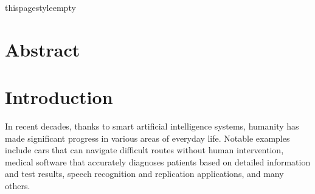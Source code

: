 \documentclass[14pt,a4paper]{extarticle}
\newcounter{e}
\newcounter{tabl}
\numberwithin{equation}{section}
\numberwithin{figure}{section}
\begin{document}
	

\thispagestyle{empty}
\newlength{\originalVOffset}
\newlength{\originalHOffset}
\setlength{\originalVOffset}{\voffset}   
\setlength{\originalHOffset}{\hoffset}
\setlength{\voffset}{0cm}
\setlength{\hoffset}{0cm}

\setlength{\voffset}{\originalVOffset}
\setlength{\hoffset}{\originalHOffset}






 \newpage
 \thispagestyle{empty}
 \renewcommand*\contentsname{Contents}
 \tableofcontents

\newpage
thispagestyle{empty}
\section*{Abstract}
\begin{center}\end{center}

 \newpage
 \thispagestyle{empty}
 \section*{Introduction}
 \begin{center}\end{center}

In recent decades, thanks to smart artificial intelligence systems, humanity has made significant progress in various areas of everyday life. Notable examples include cars that can navigate difficult routes without human intervention, medical software that accurately diagnoses patients based on detailed information and test results, speech recognition and replication applications, and many others.
\end{document}
